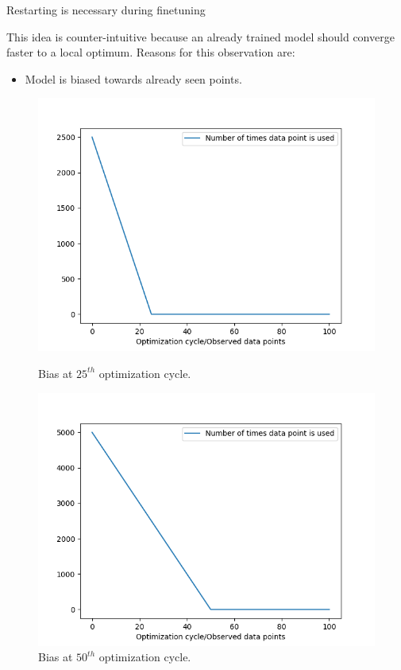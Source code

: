 \documentclass{beamer}
\begin{document}
\begin{frame}[t]{Restarting is necessary during finetuning}

This idea is counter-intuitive because an already trained model should converge faster to a local optimum. Reasons for this observation are:
\begin{itemize}
\item Model is biased towards already seen points.
\end{itemize}

\begin{figure}[h]%
\centering
\begin{minipage}{0.45\textwidth}
\includegraphics[width=\textwidth]{images/bias25}
\caption{Bias at $25^{th}$ optimization cycle.}
    \label{fig:bias25}
\end{minipage}\hfill
\begin{minipage}{0.45\textwidth}
\includegraphics[width=\textwidth]{images/bias50}
\caption{Bias at $50^{th}$ optimization cycle.}
    \label{fig:bias50}
\end{minipage}\par
\end{figure}

\end{frame}
\end{document}
